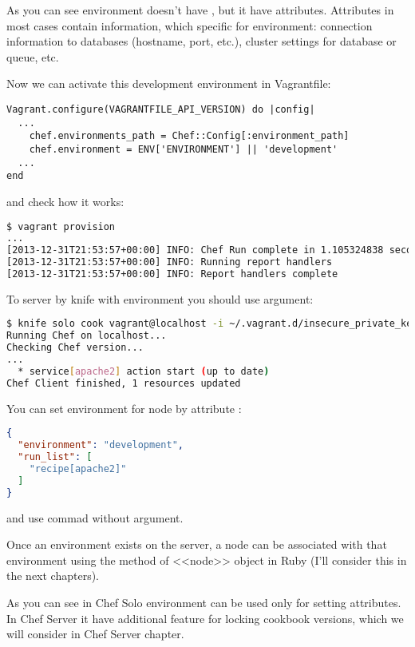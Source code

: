 As you can see environment doesn't have , but it have attributes. Attributes in most cases contain information, which specific for environment: connection information to databases (hostname, port, etc.), cluster settings for database or queue, etc.

Now we can activate this development environment in Vagrantfile:

\begin{lstlisting}[label=lst:my-cloud-chef-environment2,title=my-cloud/Vagrantfile]
Vagrant.configure(VAGRANTFILE_API_VERSION) do |config|
  ...
    chef.environments_path = Chef::Config[:environment_path]
    chef.environment = ENV['ENVIRONMENT'] || 'development'
  ...
end
\end{lstlisting}

and check how it works:

\begin{lstlisting}[language=Bash,label=lst:my-cloud-chef-environment3]
$ vagrant provision
...
[2013-12-31T21:53:57+00:00] INFO: Chef Run complete in 1.105324838 seconds
[2013-12-31T21:53:57+00:00] INFO: Running report handlers
[2013-12-31T21:53:57+00:00] INFO: Report handlers complete
\end{lstlisting}

To  server by knife with environment you should use  argument:

\begin{lstlisting}[language=Bash,label=lst:my-cloud-chef-environment4]
$ knife solo cook vagrant@localhost -i ~/.vagrant.d/insecure_private_key -p 2222 -N web1.example.com -E development
Running Chef on localhost...
Checking Chef version...
...
  * service[apache2] action start (up to date)
Chef Client finished, 1 resources updated
\end{lstlisting}

You can set environment for node by attribute :

\begin{lstlisting}[language=JSON,label=lst:my-cloud-chef-environment5,title=my-cloud/nodes/web1.example.com.json]
{
  "environment": "development",
  "run_list": [
    "recipe[apache2]"
  ]
}
\end{lstlisting}

and use commad  without  argument.

Once an environment exists on the server, a node can be associated with that environment using the  method of <<node>> object in Ruby (I'll consider this in the next chapters).

As you can see in Chef Solo environment can be used only for setting attributes. In Chef Server it have additional feature for locking cookbook versions, which we will consider in Chef Server chapter.
